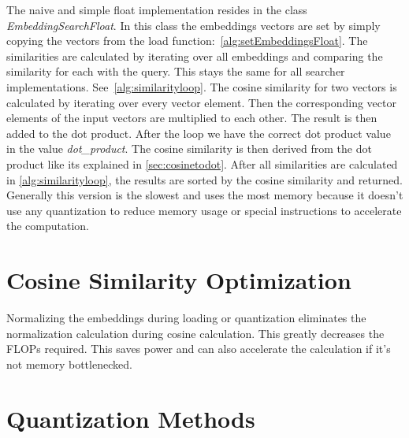The naive and simple float implementation resides in the class \textit{EmbeddingSearchFloat}. In this class the embeddings vectors are set by simply copying the vectors from the load function:~\autoref{alg:setEmbeddingsFloat}. The similarities are calculated by iterating over all embeddings and comparing the similarity for each with the query. This stays the same for all searcher implementations. See~\autoref{alg:similarityloop}.
The cosine similarity for two vectors is calculated by iterating over every vector element. Then the corresponding vector elements of the input vectors are multiplied to each other. The result is then added to the dot product. After the loop we have the correct dot product value in the value \textit{dot\_product}. The cosine similarity is then derived from the dot product like its explained in \autoref{sec:cosinetodot}.
After all similarities are calculated in \autoref{alg:similarityloop}, the results are sorted by the cosine similarity and returned. Generally this version is the slowest and uses the most memory because it doesn't use any quantization to reduce memory usage or special instructions to accelerate the computation.

\section{Cosine Similarity Optimization}
Normalizing the embeddings during loading or quantization eliminates the normalization calculation during cosine calculation. This greatly decreases the FLOPs required. This saves power and can also accelerate the calculation if it's not memory bottlenecked.

\section{Quantization Methods}
